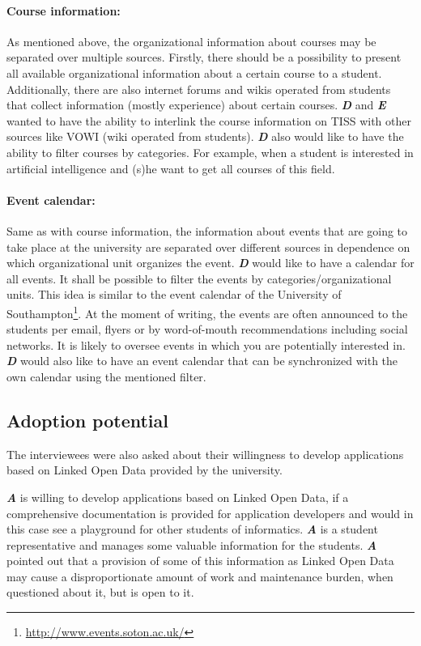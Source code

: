 \documentclass{article}
\begin{document}
\paragraph{Course information:} As mentioned above, the organizational information about courses may be separated over multiple sources. Firstly, there should be a possibility to present all available organizational information about a certain course to a student. Additionally, there are also internet forums and wikis operated from students that collect information (mostly experience) about certain courses. \textit{\textbf{D}} and \textit{\textbf{E}} wanted to have the ability to interlink the course information on TISS with other sources like VOWI (wiki operated from students). \textit{\textbf{D}} also would like to have the ability to filter courses by categories. For example, when a student is interested in artificial intelligence and (s)he want to get all courses of this field. 

\paragraph{Event calendar:} Same as with course information, the information about events that are going to take place at the university are separated over different sources in dependence on which organizational unit organizes the event. \textit{\textbf{D}} would like to have a calendar for all events. It shall be possible to filter the events by categories/organizational units. This idea is similar to the event calendar of the University of Southampton\footnote{\url{http://www.events.soton.ac.uk/}}. At the moment of writing, the events are often announced to the students per email, flyers or by word-of-mouth recommendations including social networks. It is likely to oversee events in which you are potentially interested in. \textit{\textbf{D}} would also like to have an event calendar that can be synchronized with the own calendar using the mentioned filter.

\subsection{Adoption potential}
\label{lod-benefits-challenges:adoption-potential}
The interviewees were also asked about their willingness to develop applications based on Linked Open Data provided by the university. 

\textit{\textbf{A}} is willing to develop applications based on Linked Open Data, if a comprehensive documentation is provided for application developers and would in this case see a playground for other students of informatics. \textit{\textbf{A}} is a student representative and manages some valuable information for the students. \textit{\textbf{A}} pointed out that a provision of some of this information as Linked Open Data may cause a disproportionate amount of work and maintenance burden, when questioned about it, but is open to it.
\end{document}
